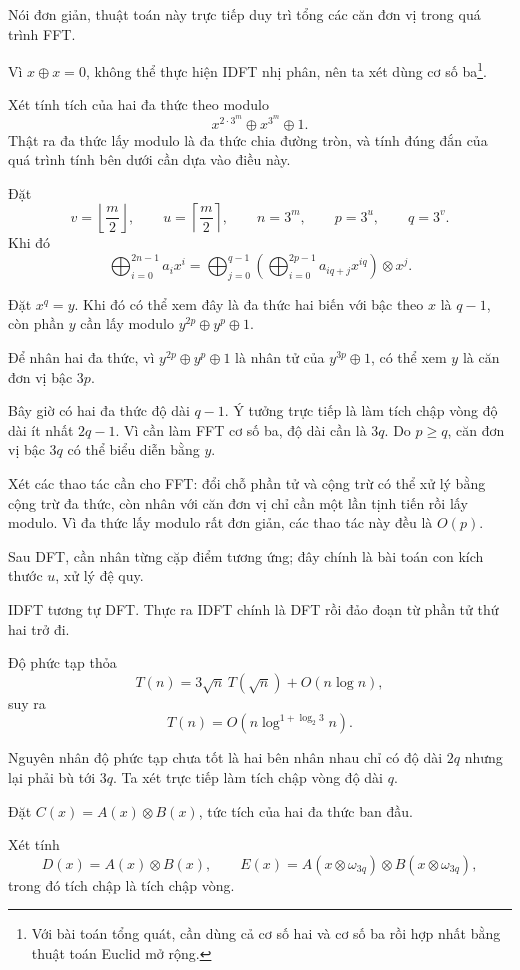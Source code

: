 \documentclass[11pt]{article}
\begin{document}
Nói đơn giản, thuật toán này trực tiếp duy trì tổng các căn đơn vị trong quá
trình FFT.

Vì \(x\oplus x=0\), không thể thực hiện IDFT nhị phân, nên ta xét dùng cơ số
ba\footnote{Với bài toán tổng quát, cần dùng cả cơ số hai và cơ số ba rồi hợp
nhất bằng thuật toán Euclid mở rộng.}.

Xét tính tích của hai đa thức theo modulo
\[
  x^{2\cdot 3^m}\oplus x^{3^m}\oplus 1.
\]
Thật ra đa thức lấy modulo là đa thức chia đường tròn, và tính đúng đắn của quá
trình tính bên dưới cần dựa vào điều này.

Đặt
\[
  v=\left\lfloor\frac m2\right\rfloor,\qquad
  u=\left\lceil\frac m2\right\rceil,\qquad
  n=3^m,\qquad p=3^u,\qquad q=3^v.
\]
Khi đó
\[
  \bigoplus_{i=0}^{2n-1} a_i x^i
  =
  \bigoplus_{j=0}^{q-1}
  \left(\bigoplus_{i=0}^{2p-1} a_{iq+j}x^{iq}\right)\otimes x^j.
\]

Đặt \(x^q=y\). Khi đó có thể xem đây là đa thức hai biến với bậc theo \(x\) là
\(q-1\), còn phần \(y\) cần lấy modulo \(y^{2p}\oplus y^p\oplus 1\).

Để nhân hai đa thức, vì \(y^{2p}\oplus y^p\oplus 1\) là nhân tử của
\(y^{3p}\oplus 1\), có thể xem \(y\) là căn đơn vị bậc \(3p\).

Bây giờ có hai đa thức độ dài \(q-1\). Ý tưởng trực tiếp là làm tích chập vòng
độ dài ít nhất \(2q-1\). Vì cần làm FFT cơ số ba, độ dài cần là \(3q\). Do
\(p\ge q\), căn đơn vị bậc \(3q\) có thể biểu diễn bằng \(y\).

Xét các thao tác cần cho FFT: đổi chỗ phần tử và cộng trừ có thể xử lý bằng cộng
trừ đa thức, còn nhân với căn đơn vị chỉ cần một lần tịnh tiến rồi lấy modulo.
Vì đa thức lấy modulo rất đơn giản, các thao tác này đều là \(O(p)\).

Sau DFT, cần nhân từng cặp điểm tương ứng; đây chính là bài toán con kích thước
\(u\), xử lý đệ quy.

IDFT tương tự DFT. Thực ra IDFT chính là DFT rồi đảo đoạn từ phần tử thứ hai trở
đi.

Độ phức tạp thỏa
\[
  T(n)=3\sqrt n\,T(\sqrt n)+O(n\log n),
\]
suy ra
\[
  T(n)=O(n\log^{1+\log_2 3} n).
\]

Nguyên nhân độ phức tạp chưa tốt là hai bên nhân nhau chỉ có độ dài \(2q\) nhưng
lại phải bù tới \(3q\). Ta xét trực tiếp làm tích chập vòng độ dài \(q\).

Đặt \(C(x)=A(x)\otimes B(x)\), tức tích của hai đa thức ban đầu.

Xét tính
\[
  D(x)=A(x)\otimes B(x),\qquad
  E(x)=A(x\otimes \omega_{3q})\otimes B(x\otimes \omega_{3q}),
\]
trong đó tích chập là tích chập vòng.
\end{document}
